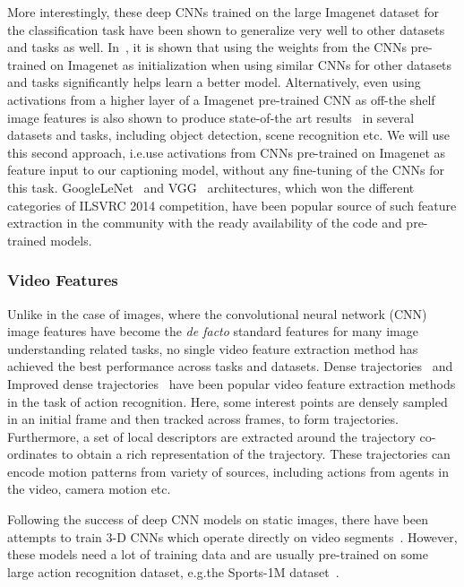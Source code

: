 More interestingly, these deep CNNs trained on the large Imagenet dataset for
the classification task have been shown to generalize very well to other
datasets and tasks as well.
In~\cite{yosinski2014transferable}, it is shown that using the weights from the
CNNs pre-trained on Imagenet as initialization when using similar CNNs for other
datasets and tasks significantly helps learn a better model.
Alternatively, even using activations from a higher layer of a Imagenet
pre-trained CNN as off-the shelf image features is also shown to produce
state-of-the art results~\cite{Donahue2014,Razavian2014CVPR} in several datasets
and tasks, including object detection, scene recognition etc.
We will use this second approach, i.e.\@ use activations from CNNs pre-trained
on Imagenet as feature input to our captioning model, without any fine-tuning of
the CNNs for this task.
GoogleLeNet~\cite{DBLP:journals/corr/SzegedyLJSRAEVR14} and
VGG~\cite{Simonyan14c} architectures, which won the different categories of
ILSVRC 2014 competition, have been popular source of such feature extraction in
the community with the ready availability of the code and pre-trained models.

\subsubsection{Video Features}
Unlike in the case of images, where the convolutional neural network (CNN) image
features have become the \emph{de facto} standard features for many image
understanding related tasks, no single video feature extraction method has
achieved the best performance across tasks and datasets.
Dense trajectories~\cite{DBLP:conf/cvpr/WangKSL11} and Improved dense
trajectories~\cite{Wang2013} have been popular video feature extraction methods
in the task of action recognition.
Here, some interest points are densely sampled in an initial frame and then tracked
across frames, to form trajectories.
Furthermore, a set of local descriptors are extracted around the trajectory
co-ordinates to obtain a rich representation of the trajectory.
These trajectories can encode motion patterns from variety of sources, including
actions from agents in the video, camera motion etc.

Following the success of deep CNN models on static images, there have been
attempts to train 3-D CNNs which operate directly on video
segments~\cite{3dCNN_ji2013, KarpathyCVPR14, DBLP:C3D}.
However, these models need a lot of training data and are usually pre-trained on
some large action recognition dataset, e.g.\@ the Sports-1M
dataset~\cite{KarpathyCVPR14}.


